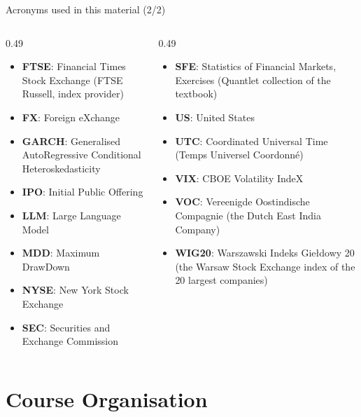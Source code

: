 \begin{frame}{Acronyms used in this material (2/2)}
\begin{columns}[T]
\begin{column}{0.49\textwidth}
\begin{itemize}\setlength{\itemsep}{0pt}
    \item \textbf{FTSE}: Financial Times Stock Exchange (FTSE Russell, index provider)
    \item \textbf{FX}: Foreign eXchange
    \item \textbf{GARCH}: Generalised AutoRegressive Conditional Heteroskedasticity
    \item \textbf{IPO}: Initial Public Offering
    \item \textbf{LLM}: Large Language Model
    \item \textbf{MDD}: Maximum DrawDown
    \item \textbf{NYSE}: New York Stock Exchange
    \item \textbf{SEC}: Securities and Exchange Commission
\end{itemize}
\end{column}
\begin{column}{0.49\textwidth}
\begin{itemize}\setlength{\itemsep}{0pt}
    \item \textbf{SFE}: Statistics of Financial Markets, Exercises (Quantlet collection of the textbook)
    \item \textbf{US}: United States
    \item \textbf{UTC}: Coordinated Universal Time (Temps Universel Coordonné)
    \item \textbf{VIX}: CBOE Volatility IndeX
    \item \textbf{VOC}: Vereenigde Oostindische Compagnie (the Dutch East India Company)
    \item \textbf{WIG20}: Warszawski Indeks Giełdowy 20 (the Warsaw Stock Exchange index of the 20 largest companies)
\end{itemize}
\end{column}
\end{columns}
\end{frame}

\section{Course Organisation}

